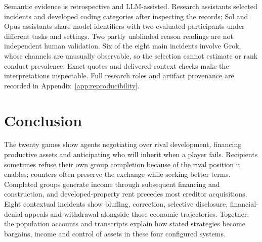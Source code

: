 Semantic evidence is retrospective and LLM-assisted. Research assistants selected incidents and developed coding categories after inspecting the records; Sol and Opus assistants share model identifiers with two evaluated participants under different tasks and settings. Two partly unblinded reason readings are not independent human validation. Six of the eight main incidents involve Grok, whose channels are unusually observable, so the selection cannot estimate or rank conduct prevalence. Exact quotes and delivered-context checks make the interpretations inspectable. Full research roles and artifact provenance are recorded in Appendix~\ref{app:reproducibility}.

\section{Conclusion}

The twenty games show agents negotiating over rival development, financing productive assets and anticipating who will inherit when a player fails. Recipients sometimes refuse their own group completion because of the rival position it enables; counters often preserve the exchange while seeking better terms. Completed groups generate income through subsequent financing and construction, and developed-property rent precedes most creditor acquisitions. Eight contextual incidents show bluffing, correction, selective disclosure, financial-denial appeals and withdrawal alongside those economic trajectories. Together, the population accounts and transcripts explain how stated strategies become bargains, income and control of assets in these four configured systems.
